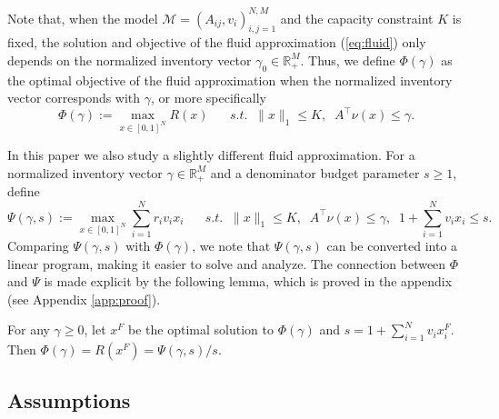 \documentclass[opre]{informs3aa}
\begin{document}
Note that, when the model $\mathcal M=(A_{ij},v_i)_{i,j=1}^{N,M}$ and the capacity constraint $K$ is fixed,
the solution and objective of the fluid approximation (\ref{eq:fluid}) only depends on the normalized inventory vector $\gamma_0\in\mathbb R_+^M$.
Thus, we define $\Phi(\gamma)$ as the optimal objective of the fluid approximation when the normalized inventory vector corresponds with $\gamma$, or more specifically
\begin{equation}
\Phi(\gamma) := \max_{x\in[0,1]^N} R(x)\;\;\;\;\;\;s.t.\;\; \|x\|_1\leq K,\;\; A^\top \nu(x) \leq \gamma.
\label{eq:Phi}
\end{equation}
%

In this paper we also study a slightly different fluid approximation. For a normalized inventory vector $\gamma\in\mathbb R_+^M$
and a denominator budget parameter $s\geq 1$, define
\begin{equation}
\textstyle
\Psi(\gamma,s) := \max_{x\in[0,1]^N} \sum_{i=1}^N r_iv_ix_i \;\;\;\;\;\;s.t.\;\;\|x\|_1\leq K,\;\; A^\top\nu(x)\leq\gamma,\;\; 1+\sum_{i=1}^Nv_ix_i \leq s.
\label{eq:Psi}
\end{equation}
Comparing $\Psi(\gamma,s)$ with $\Phi(\gamma)$, we note that $\Psi(\gamma,s)$ can be converted into a linear program,
making it easier to solve and analyze. The connection between $\Phi$ and $\Psi$ is made explicit by the following lemma, which is proved in the appendix (see Appendix \ref{app:proof}).
\begin{lemma}
{For any $\gamma\geq 0$,}
let $x^F$ be the optimal solution to $\Phi(\gamma)$ and $s=1+\sum_{i=1}^N {v_i}x_i^F$. Then $\Phi(\gamma)=R(x^F) = \Psi(\gamma,s)/s$.
\label{lem:phi-psi}
\end{lemma}


\subsection{Assumptions}
\end{document}
